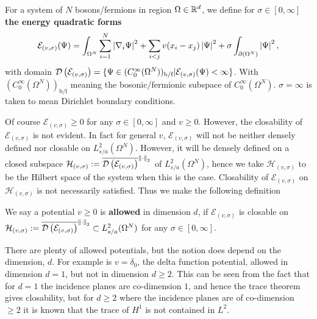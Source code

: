 \begin{definition}
	For a system of $ N $ bosons/fermions in region $ \Omega\in\mathbb{R}^d $, we define for $ \sigma\in[0,\infty] $ \textbf{the energy quadratic forms}
\begin{equation}\label{key}
\mathcal{E}_{(v,\sigma)}(\Psi)=\int_{\Omega^N} \sum_{i=1}^{N}\left\lvert \nabla_i\Psi \right\rvert^2+\sum_{i<j} v(x_i-x_j)\left\lvert \Psi \right\rvert^2+\sigma\int_{\partial (\Omega^N)}\left\lvert \Psi \right\rvert^2,
\end{equation}
with domain $ \mathcal D\left(\mathcal{E}_{(v,\sigma)}\right)=\{\Psi\in (C^\infty_0(\Omega^N))_{\text{b/f}}\vert \mathcal{E}_{(v,\sigma)}(\Psi)<\infty\} $. With $ (C^\infty_0(\Omega^N))_{\text{b/f}} $ meaning the bosonic/fermionic subspace of $ C^\infty_0(\Omega^N) $. $ \sigma=\infty $ is taken to mean Dirichlet boundary conditions.
\end{definition}
Of course $ \mathcal{E}_{(v,\sigma)}\geq 0 $ for any $ \sigma\in[0,\infty] $ and $ v\geq 0 $. However, the closability of $ \mathcal{E}_{(v,\sigma)} $ is not evident. In fact for general $ v $, $ \mathcal{E}_{(v,\sigma)} $ will not be neither densely defined nor closable on $ L^2_{s/a}(\Omega^N) $. However, it will be densely defined on a closed subspace $ \mathcal{H}_{(v,\sigma)}:=\overline{\mathcal D\left(\mathcal{E}_{(v,\sigma)}\right)}^{\left\lVert \cdot \right\rVert_2} $ of $ L^2_{s/a}(\Omega^N) $, hence we take $ \mathcal{H}_{(v,\sigma)} $ to be the Hilbert space of the system when this is the case. Closability of $ \mathcal{E}_{(v,\sigma)} $ on $ \mathcal{H}_{(v,\sigma)} $ is not necessarily satisfied. Thus we make the following definition
\begin{definition}
	We say a potential $ v\geq 0 $ is \textbf{allowed} in dimension $ d $, if $ \mathcal{E}_{(v,\sigma)} $ is closable on $ \mathcal{H}_{(v,\sigma)}:=\overline{\mathcal D\left(\mathcal{E}_{(v,\sigma)}\right)}^{\left\lVert \cdot \right\rVert_2}\subset L^2_{s/a}(\Omega^N)$ for any $ \sigma\in[0,\infty] $.
\end{definition}
\begin{remark}
	There are plenty of allowed potentials, but the notion does depend on the dimension, $ d $. For example is $ v=\delta_0 $, \ie the delta function potential, allowed in dimension $ d=1 $, but not in dimension $ d\geq 2 $. This can be seen from the fact that for $ d=1 $ the incidence planes are co-dimension $ 1 $, and hence the trace theorem gives closability, but for $ d\geq 2 $ where the incidence planes are of co-dimension $ \geq 2 $ it is known that the trace of $ H^1 $ is not contained in $ L^2 $.
\end{remark}

